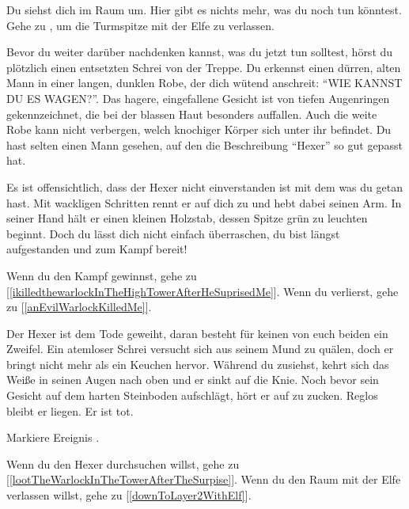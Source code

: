
Du siehst dich im Raum um. Hier gibt es nichts mehr, was du noch tun könntest.
Gehe zu , um die Turmspitze mit der Elfe zu verlassen.


Bevor du weiter darüber nachdenken kannst, was du jetzt tun solltest, hörst du plötzlich einen entsetzten Schrei von der Treppe. Du erkennst einen dürren, alten Mann in einer langen, dunklen Robe, der dich wütend anschreit: ``WIE KANNST DU ES WAGEN?''. Das hagere, eingefallene Gesicht ist von tiefen Augenringen gekennzeichnet, die bei der blassen Haut besonders auffallen. Auch die weite Robe kann nicht verbergen, welch knochiger Körper sich unter ihr befindet. Du hast selten einen Mann gesehen, auf den die Beschreibung ``Hexer'' so gut gepasst hat.

Es ist offensichtlich, dass der Hexer nicht einverstanden ist mit dem was du getan hast. Mit wackligen Schritten rennt er auf dich zu und hebt dabei seinen Arm. In seiner Hand hält er einen kleinen Holzstab, dessen Spitze grün zu leuchten beginnt. Doch du lässt dich nicht einfach überraschen, du bist längst aufgestanden und zum Kampf bereit!

\monsterWarlock

Wenn du den Kampf gewinnst, gehe zu [\ref{ikilledthewarlockInTheHighTowerAfterHeSuprisedMe}].
Wenn du verlierst, gehe zu [\ref{anEvilWarlockKilledMe}].


Der Hexer ist dem Tode geweiht, daran besteht für keinen von euch beiden ein Zweifel. Ein atemloser Schrei versucht sich aus seinem Mund zu quälen, doch er bringt nicht mehr als ein Keuchen hervor. Während du zusiehst, kehrt sich das Weiße in seinen Augen nach oben und er sinkt auf die Knie. Noch bevor sein Gesicht auf dem harten Steinboden aufschlägt, hört er auf zu zucken. Reglos bleibt er liegen. Er ist tot.

Markiere Ereignis .

Wenn du den Hexer durchsuchen willst, gehe zu [\ref{lootTheWarlockInTheTowerAfterTheSurpise}].
Wenn du den Raum mit der Elfe verlassen willst, gehe zu [\ref{downToLayer2WithElf}].


